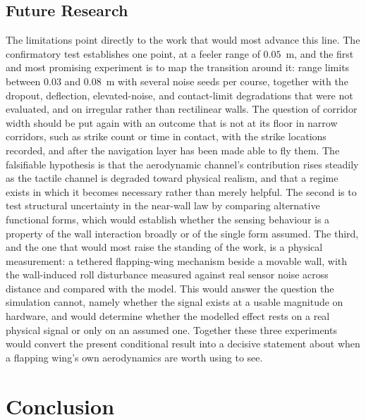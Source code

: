 \documentclass[final,5p,times]{elsarticle}
\begin{document}
\subsection{Future Research}
\label{sec:disc_future}

The limitations point directly to the work that would most advance this line. The confirmatory test establishes one point, at a feeler range of $0.05$~m, and the first and most promising experiment is to map the transition around it: range limits between $0.03$ and $0.08$~m with several noise seeds per course, together with the dropout, deflection, elevated-noise, and contact-limit degradations that were not evaluated, and on irregular rather than rectilinear walls. The question of corridor width should be put again with an outcome that is not at its floor in narrow corridors, such as strike count or time in contact, with the strike locations recorded, and after the navigation layer has been made able to fly them. The falsifiable hypothesis is that the aerodynamic channel's contribution rises steadily as the tactile channel is degraded toward physical realism, and that a regime exists in which it becomes necessary rather than merely helpful. The second is to test structural uncertainty in the near-wall law by comparing alternative functional forms, which would establish whether the sensing behaviour is a property of the wall interaction broadly or of the single form assumed. The third, and the one that would most raise the standing of the work, is a physical measurement: a tethered flapping-wing mechanism beside a movable wall, with the wall-induced roll disturbance measured against real sensor noise across distance and compared with the model. This would answer the question the simulation cannot, namely whether the signal exists at a usable magnitude on hardware, and would determine whether the modelled effect rests on a real physical signal or only on an assumed one. Together these three experiments would convert the present conditional result into a decisive statement about when a flapping wing's own aerodynamics are worth using to see.

\section{Conclusion}
\label{sec:conclusion}
\end{document}
